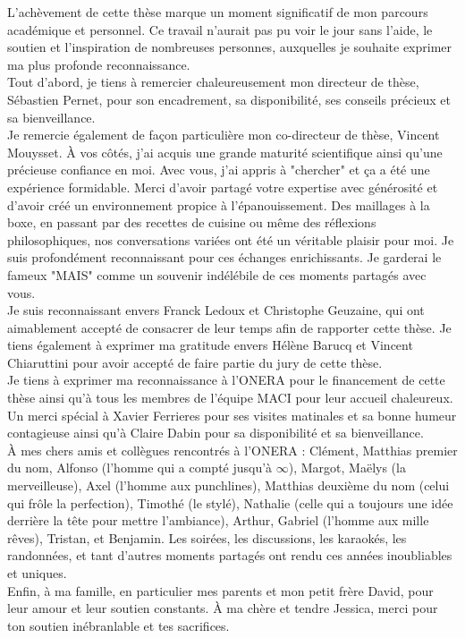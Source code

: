 L’achèvement de cette thèse marque un moment significatif de mon parcours académique et personnel. Ce travail n’aurait pas pu voir le jour sans l’aide, le soutien et l’inspiration de nombreuses personnes, auxquelles je souhaite exprimer ma plus profonde reconnaissance.\\

Tout d'abord, je tiens à remercier chaleureusement mon directeur de thèse, Sébastien Pernet, pour son encadrement, sa disponibilité, ses conseils précieux et sa bienveillance.\\

Je remercie également de façon particulière mon co-directeur de thèse, Vincent Mouysset. À vos côtés, j'ai acquis une grande maturité scientifique ainsi qu'une précieuse confiance en moi. Avec vous, j'ai appris à "chercher" et ça a été une expérience formidable. Merci d’avoir partagé votre expertise avec générosité et d’avoir créé un environnement propice à l’épanouissement. Des maillages à la boxe, en passant par des recettes de cuisine ou même des réflexions philosophiques, nos conversations variées ont été un véritable plaisir pour moi. Je suis profondément reconnaissant pour ces échanges enrichissants. Je garderai le fameux "MAIS" comme un souvenir indélébile de ces moments partagés avec vous.\\

Je suis reconnaissant envers Franck Ledoux et Christophe Geuzaine, qui ont aimablement accepté de consacrer de leur temps afin de rapporter cette thèse. Je tiens également à exprimer ma gratitude envers Hélène Barucq et Vincent Chiaruttini pour avoir accepté de faire partie du jury de cette thèse.\\

Je tiens à exprimer ma reconnaissance à l'ONERA pour le financement de cette thèse ainsi qu’à tous les membres de l'équipe MACI pour leur accueil chaleureux. Un merci spécial à Xavier Ferrieres pour ses visites matinales et sa bonne humeur contagieuse ainsi qu'à Claire Dabin pour sa disponibilité et sa bienveillance.\\

À mes chers amis et collègues rencontrés à l'ONERA : Clément, Matthias premier du nom, Alfonso (l'homme qui a compté jusqu'à $\infty$), Margot, Maëlys (la merveilleuse), Axel (l'homme aux punchlines), Matthias deuxième du nom (celui qui frôle la perfection), Timothé (le stylé), Nathalie (celle qui a toujours une idée derrière la tête pour mettre l'ambiance), Arthur, Gabriel (l'homme aux mille rêves), Tristan, et Benjamin. Les soirées, les discussions, les karaokés, les randonnées, et tant d'autres moments partagés ont rendu ces années inoubliables et uniques.\\

Enfin, à ma famille, en particulier mes parents et mon petit frère David, pour leur amour et leur soutien constants. À ma chère et tendre Jessica, merci pour ton soutien inébranlable et tes sacrifices.
